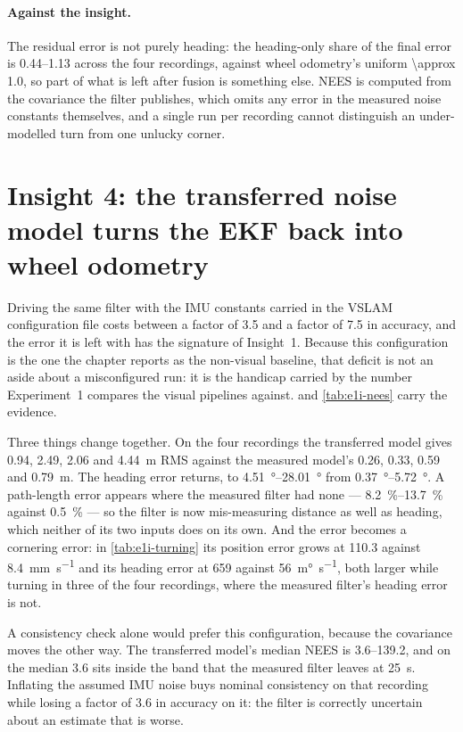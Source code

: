 \documentclass[11pt,a4paper,notitlepage]{report}
\begin{document}
\paragraph{Against the insight.} The residual error is not purely heading:
the heading-only share of the final error is \numrange{0.44}{1.13} across the
four recordings, against wheel odometry's uniform \num{\approx 1.0}, so part of
what is left after fusion is something else. NEES is computed from the
covariance the filter publishes, which omits any error in the measured noise
constants themselves, and a single run per recording cannot distinguish an
under-modelled turn from one unlucky corner.

\FloatBarrier
\section{Insight 4: the transferred noise model turns the EKF back into
         wheel odometry}

Driving the same filter with the IMU constants carried in the VSLAM
configuration file costs between a factor of \num{3.5} and a factor of
\num{7.5} in accuracy, and the error it is left with has the signature of
Insight~1. Because this configuration is the one the chapter reports as the
non-visual baseline, that deficit is not an aside about a misconfigured run:
it is the handicap carried by the number Experiment~1 compares the visual
pipelines against.  and \cref{tab:e1i-nees} carry the
evidence.

Three things change together. On the four recordings the transferred model
gives \SI{0.94}{},
\SI{2.49}{}, \SI{2.06}{} and \SI{4.44}{\metre} RMS against the measured
model's \SI{0.26}{}, \SI{0.33}{}, \SI{0.59}{} and \SI{0.79}{\metre}. The heading error returns, to
\SIrange{4.51}{28.01}{\degree} from \SIrange{0.37}{5.72}{\degree}. A
path-length error appears where the measured filter had none ---
\SIrange{8.2}{13.7}{\percent} against \SI{0.5}{\percent} --- so the filter is now
mis-measuring distance as well as heading, which neither of its two inputs
does on its own. And the error becomes a cornering error: in
\cref{tab:e1i-turning} its position error grows at \SI{110.3}{} against
\SI{8.4}{\milli\metre\per\second} and its heading error at \SI{659}{} against
\SI{56}{\milli\degree\per\second}, both larger while turning in three of the
four recordings, where the measured filter's heading error is not.

A consistency check alone would prefer this configuration, because the
covariance moves the other way. The transferred model's median NEES is
\numrange{3.6}{139.2}, and on  the median
\num{3.6} sits inside the band that the measured filter leaves at
\SI{25}{\second}. Inflating the assumed IMU noise buys nominal consistency on
that recording while losing a factor of \num{3.6} in accuracy on it: the
filter is correctly uncertain about an estimate that is worse.
\end{document}
